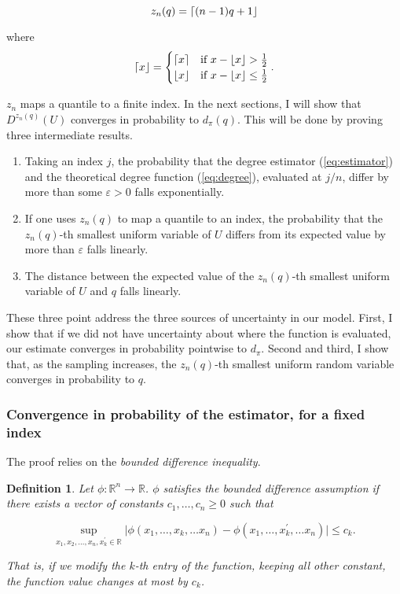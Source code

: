 \documentclass[american, abstract=on]{scrartcl}
\newtheorem{definition}{Definition}[section]
\renewcommand{\Re}{\mathbb{R}}
\DeclarePairedDelimiter\round{\lceil}{\rfloor}
\begin{document}
\begin{equation}
  z_n(q) = \round*{(n-1)q + 1}
\end{equation}

where 
\begin{equation}
  \round*{x} = \begin{cases}
    \lceil x \rceil &\text{if } x - \lfloor x \rfloor > \frac{1}{2} \\
    \lfloor x \rfloor &\text{if } x - \lfloor x \rfloor \leq \frac{1}{2}
  \end{cases}.
\end{equation}

$z_n$ maps a quantile to a finite index. In the next sections, I will show that $D^{z_n(q)}(U)$ converges in probability to $d_{\pi}(q)$. This will be done by proving three intermediate results.

\begin{enumerate}
  \item Taking an index $j$, the probability that the degree estimator (\ref{eq:estimator}) and the theoretical degree function (\ref{eq:degree}), evaluated at $j / n$, differ by more than some $\varepsilon > 0$ falls exponentially.
  \item If one uses $z_n(q)$ to map a quantile to an index, the probability that the $z_n(q)$-th smallest uniform variable of $U$ differs from its expected value by more than $\varepsilon$ falls linearly. 
  \item The distance between the expected value of the $z_n(q)$-th smallest uniform variable of $U$ and $q$ falls linearly.
\end{enumerate}

These three point address the three sources of uncertainty in our model. First, I show that if we did not have uncertainty about where the function is evaluated, our estimate converges in probability pointwise to $d_\pi$. Second and third, I show that, as the sampling increases, the $z_n(q)$-th smallest uniform random variable converges in probability to $q$.

\subsubsection{Convergence in probability of the estimator, for a fixed index}


The proof relies on the \textit{bounded difference inequality}.

\begin{definition}
  Let $\phi: \Re^n \to \Re$. $\phi$ satisfies the bounded difference assumption if there exists a vector of constants $c_1, \ldots, c_n \geq 0$ such that
  
  \begin{equation}
    \sup_{x_1, x_2, \ldots, x_n, x_k^\prime \in \Re} \lvert \phi(x_1, \ldots, x_k, \ldots x_n) -  \phi(x_1, \ldots, x_k^\prime, \ldots x_n)\rvert \leq c_k.
  \end{equation}

  That is, if we modify the $k$-th entry of the function, keeping all other constant, the function value changes at most by $c_k$.
\end{definition}
\end{document}
